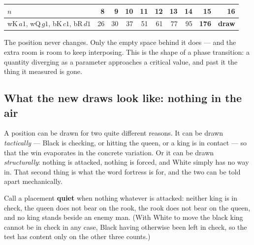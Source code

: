 \documentclass[11pt]{article}
\begin{document}
\begin{center}\small
\begin{tabular}{@{}lrrrrrrrrr@{}}
\toprule
$n$ & 8 & 9 & 10 & 11 & 12 & 13 & 14 & 15 & 16 \\
\midrule
wK\,$a1$, wQ\,$g1$, bK\,$c1$, bR\,$d1$ & 26 & 30 & 37 & 51 & 61 & 77 & 95 &
  \textbf{176} & \textbf{draw} \\
\bottomrule
\end{tabular}
\end{center}

\noindent
The position never changes. Only the empty space behind it does --- and the
extra room is room to keep interposing. This is the shape of a phase
transition: a quantity diverging as a parameter approaches a critical value,
and past it the thing it measured is gone.

\subsection{What the new draws look like: nothing in the air}\label{sub:kqkr-quiet}

A position can be drawn for two quite different reasons. It can be drawn
\emph{tactically} --- Black is checking, or hitting the queen, or a king is in
contact --- so that the win evaporates in the concrete variation. Or it can be
drawn \emph{structurally}: nothing is attacked, nothing is forced, and White
simply has no way in. That second thing is what the word fortress is for, and
the two can be told apart mechanically.

Call a placement \textbf{quiet} when nothing whatever is attacked: neither king
is in check, the queen does not bear on the rook, the rook does not bear on the
queen, and no king stands beside an enemy man. (With White to move the black
king cannot be in check in any case, Black having otherwise been left in check,
so the test has content only on the other three counts.)
\end{document}

